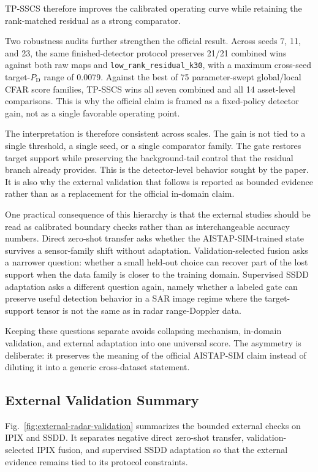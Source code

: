 \documentclass[journal]{IEEEtran}
\begin{document}
TP-SSCS therefore improves the calibrated operating curve while retaining the rank-matched residual as a strong comparator.

Two robustness audits further strengthen the official result. Across seeds 7, 11, and 23, the same finished-detector protocol preserves 21/21 combined wins against both raw maps and \texttt{low\_rank\_residual\_k30}, with a maximum cross-seed target-$P_{\mathrm{D}}$ range of 0.0079. Against the best of 75 parameter-swept global/local CFAR score families, TP-SSCS wins all seven combined and all 14 asset-level comparisons. This is why the official claim is framed as a fixed-policy detector gain, not as a single favorable operating point.

The interpretation is therefore consistent across scales. The gain is not tied to a single threshold, a single seed, or a single comparator family. The gate restores target support while preserving the background-tail control that the residual branch already provides. This is the detector-level behavior sought by the paper. It is also why the external validation that follows is reported as bounded evidence rather than as a replacement for the official in-domain claim.

One practical consequence of this hierarchy is that the external studies should be read as calibrated boundary checks rather than as interchangeable accuracy numbers. Direct zero-shot transfer asks whether the AISTAP-SIM-trained state survives a sensor-family shift without adaptation. Validation-selected fusion asks a narrower question: whether a small held-out choice can recover part of the lost support when the data family is closer to the training domain. Supervised SSDD adaptation asks a different question again, namely whether a labeled gate can preserve useful detection behavior in a SAR image regime where the target-support tensor is not the same as in radar range-Doppler data.

Keeping these questions separate avoids collapsing mechanism, in-domain validation, and external adaptation into one universal score. The asymmetry is deliberate: it preserves the meaning of the official AISTAP-SIM claim instead of diluting it into a generic cross-dataset statement.

\subsection{External Validation Summary}

Fig.~\ref{fig:external-radar-validation} summarizes the bounded external checks on IPIX and SSDD. It separates negative direct zero-shot transfer, validation-selected IPIX fusion, and supervised SSDD adaptation so that the external evidence remains tied to its protocol constraints.
\end{document}
